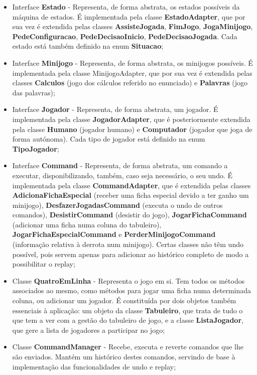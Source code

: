 \documentclass[11pt]{article}
\begin{document}
	\begin{itemize}
		\item Interface \textbf{Estado} - Representa, de forma abstrata, os estados possíveis da máquina de estados. É implementada pela classe \textbf{EstadoAdapter}, que por sua vez é extendida pelas classes \textbf{AssisteJogada}, \textbf{FimJogo}, \textbf{JogaMinijogo}, \textbf{PedeConfiguracao}, \textbf{PedeDecisaoInicio}, \textbf{PedeDecisaoJogada}. Cada estado está também definido na enum \textbf{Situacao};
		\item Interface \textbf{Minijogo} - Representa, de forma abstrata, os minijogos possíveis. É implementada pela classe MinijogoAdapter, que por sua vez é extendida pelas classes \textbf{Calculos} (jogo dos cálculos referido no enunciado) e \textbf{Palavras} (jogo das palavras);
		\item Interface \textbf{Jogador} - Representa, de forma abstrata, um jogador. É implementada pela classe \textbf{JogadorAdapter}, que é posteriormente extendida pela classe \textbf{Humano} (jogador humano) e \textbf{Computador} (jogador que joga de forma autónoma). Cada tipo de jogador está definido na enum \textbf{TipoJogador};
		\item Interface \textbf{Command} - Representa, de forma abstrata, um comando a executar, disponibilizando, também, caso seja necessário, o seu undo. É implementada pela classe \textbf{CommandAdapter}, que é extendida pelas classes \textbf{AdicionaFichaEspecial} (receber uma ficha especial devido a ter ganho um minijogo), \textbf{DesfazerJogadasCommand} (executa o undo de outros comandos), \textbf{DesistirCommand} (desistir do jogo), \textbf{JogarFichaCommand} (adicionar uma ficha numa coluna do tabuleiro), \textbf{JogarFichaEspecialCommand} e \textbf{PerderMinijogoCommand} (informação relativa à derrota num minijogo). Certas classes não têm undo possível, pois servem apenas para adicionar ao histórico completo de modo a possibilitar o replay;
		\item Classe \textbf{QuatroEmLinha} - Representa o jogo em si. Tem todos os métodos associados ao mesmo, como métodos para jogar uma ficha numa determinada coluna, ou adicionar um jogador. É constituída por dois objetos também essenciais à aplicação: um objeto da classe \textbf{Tabuleiro}, que trata de tudo o que tem a ver com a gestão do tabuleiro de jogo, e a classe \textbf{ListaJogador}, que gere a lista de jogadores a participar no jogo;
		\item Classe \textbf{CommandManager} - Recebe, executa e reverte comandos que lhe são enviados. Mantém um histórico destes comandos, servindo de base à implementação das funcionalidades de undo e replay;

\end{itemize}
\end{document}
